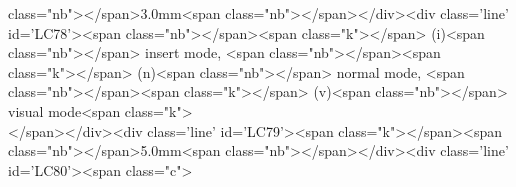 class="nb">{</span>3.0mm<span class="nb">}</span></div><div class='line' id='LC78'><span class="nb">{</span><span class="k">\normalsize</span> (i)<span class="nb">}</span> insert mode, <span class="nb">{</span><span class="k">\normalsize</span> (n)<span class="nb">}</span> normal mode, <span class="nb">{</span><span class="k">\normalsize</span> (v)<span class="nb">}</span> visual mode<span class="k">\\</span></div><div class='line' id='LC79'><span class="k">\vspace</span><span class="nb">{</span>5.0mm<span class="nb">}</span></div><div class='line' id='LC80'><span class="c">%